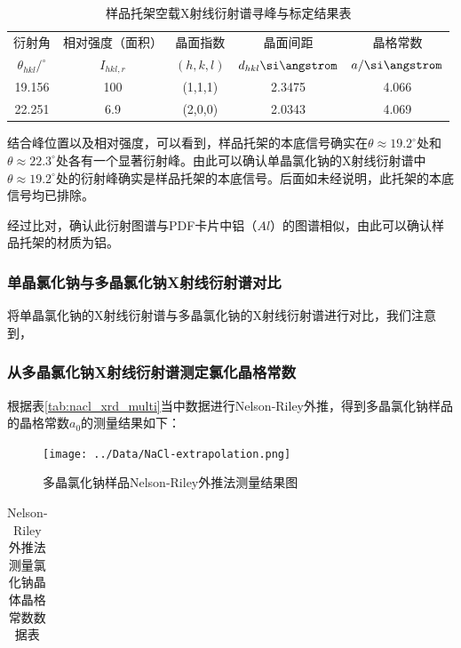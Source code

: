 \documentclass{thuemp}
\begin{document}
\begin{table}[H]
    \centering
    \captionnamefont{\wuhao\bf\heiti}
    \captiontitlefont{\wuhao\bf\heiti}
    \caption{样品托架空载X射线衍射谱寻峰与标定结果表}
    \label{tab:nacl_xrd_holder}
    \liuhao
    \begin{tabular}{ccccc}
        \toprule
        衍射角 & 相对强度（面积）& 晶面指数 & 晶面间距 & 晶格常数 \\
        $\theta_{hkl}/^\circ$ & $I_{hkl,r}$ & $(h,k,l)$ & $d_{hkl}\text{\si\angstrom}$ & $a/\text{\si\angstrom}$\\
        \midrule
        19.156 & 100 & (1,1,1) & 2.3475 & 4.066 \\
        22.251 & 6.9 & (2,0,0) & 2.0343 & 4.069 \\
        \bottomrule
    \end{tabular}
\end{table}

结合峰位置以及相对强度，可以看到，样品托架的本底信号确实在$\theta \approx 19.2^\circ$处和$\theta \approx 22.3^\circ$处各有一个显著衍射峰。由此可以确认单晶氯化钠的X射线衍射谱中$\theta \approx 19.2^\circ$处的衍射峰确实是样品托架的本底信号。后面如未经说明，此托架的本底信号均已排除。

经过比对，确认此衍射图谱与PDF卡片中铝（$Al$）的图谱相似，由此可以确认样品托架的材质为铝。

\subsubsection{单晶氯化钠与多晶氯化钠X射线衍射谱对比}

将单晶氯化钠的X射线衍射谱与多晶氯化钠的X射线衍射谱进行对比，我们注意到，

\subsubsection{从多晶氯化钠X射线衍射谱测定氯化晶格常数}

根据表\ref{tab:nacl_xrd_multi}当中数据进行Nelson-Riley外推，得到多晶氯化钠样品的晶格常数$a_0$的测量结果如下：

\begin{figure}[H]
    \centering
    \texttt{[image: ../Data/NaCl-extrapolation.png]}
    \caption{多晶氯化钠样品Nelson-Riley外推法测量结果图}
    \label{fig:nacl_xrd_extrapol}
\end{figure}

\begin{table}[H]
    \centering
    \captionnamefont{\wuhao\bf\heiti}
    \captiontitlefont{\wuhao\bf\heiti}
    \caption{Nelson-Riley外推法测量氯化钠晶体晶格常数数据表}
    \label{tab:nacl_xrd_extrapol}
    \liuhao
    \begin{tabular}{ccccc}
        \toprule
        \midrule
        \bottomrule
    \end{tabular}
\end{table}
\end{document}
